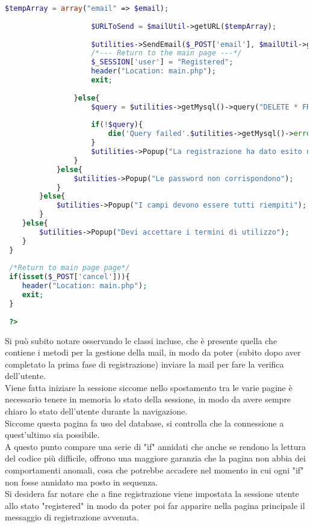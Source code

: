 \begin{lstlisting}[language=php]
 					$tempArray = array("email" => $email);
 					
 					$URLToSend = $mailUtil->getURL($tempArray);
 					
 					$utilities->SendEmail($_POST['email'], $mailUtil->getSubject(), $mailUtil->getBody($URLToSend), $mailUtil->getAlternativeBody($URLToSend));
 					/*--- Return to the main page ---*/
 					$_SESSION['user'] = "Registered";
 					header("Location: main.php");
 					exit;
 					
 				}else{
 					$query = $utilities->getMysql()->query("DELETE * FROM usert_table1 WHERE (email = '{$email}')");
 					
 					if(!$query){
 						die('Query failed'.$utilities->getMysql()->error);
 					} 
					$utilities->Popup("La registrazione ha dato esito negativo");
 				}
 			}else{
 				$utilities->Popup("Le password non corrispondono");
 			}
 		}else{
 			$utilities->Popup("I campi devono essere tutti riempiti");
 		}
 	}else{
 		$utilities->Popup("Devi accettare i termini di utilizzo");
 	}
 }
 
 /*Return to main page page*/
 if(isset($_POST['cancel'])){
 	header("Location: main.php");
 	exit;
 }
 
 ?>
 \end{lstlisting}
 
 Si può subito notare osservando le classi incluse, che è presente quella che contiene i metodi per la gestione della mail, in modo da poter (subito dopo aver completato la prima fase di registrazione) inviare la mail per fare la verifica dell'utente.\\
 Viene fatta iniziare la sessione siccome nello spostamento tra le varie pagine è necessario tenere in memoria lo stato della sessione, in modo da avere sempre chiaro lo stato dell'utente durante la navigazione.\\
 Siccome questa pagina fa uso del database, si controlla che la connessione a quest'ultimo sia possibile.\\
 A questo punto compare una serie di "if" annidati che anche se rendono la lettura del codice più difficile, offrono una maggiore garanzia che la pagina non abbia dei comportamenti anomali, cosa che potrebbe accadere nel momento in cui ogni "if" non fosse annidato ma posto in sequenza.\\
 Si desidera far notare che a fine registrazione viene impostata la sessione utente allo stato "registered" in modo da poter poi far apparire nella pagina principale il messaggio di registrazione avvenuta.\\
 
